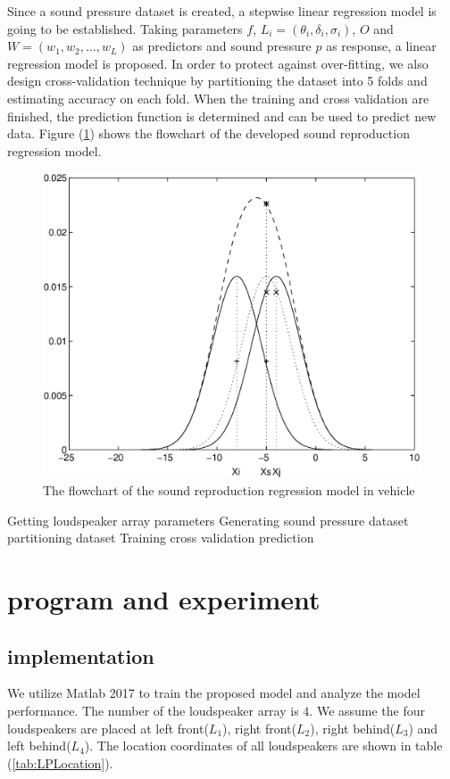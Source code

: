 \documentclass[runningheads,a4paper]{llncs}
\begin{document}
  Since a sound pressure dataset is created, a stepwise linear regression model is going to be established. Taking parameters $f$, $L_i=(\theta_i,\delta_i,\sigma_i)$, $O$ and $ W=(w_1,w_2,\dots,w_L) $ as predictors and sound pressure $p$ as response, a linear regression model is proposed. In order to protect against over-fitting, we also design cross-validation technique by partitioning the dataset into 5 folds and estimating accuracy on each fold. When the training and cross validation are finished, the prediction function is determined and can be used to predict new data. Figure (\ref{fig:ModelFlowchart}) shows the flowchart of the developed sound reproduction regression model.
  \begin{figure}[htb]
    \centering
    \includegraphics[width=11.5cm]{888.eps}
    \caption{The flowchart of the sound reproduction regression model in vehicle}
    \label{fig:ModelFlowchart}
  \end{figure}

Getting loudspeaker array parameters
Generating sound pressure dataset
partitioning dataset
Training
cross validation
prediction

%

\section{program and experiment}\label{sec:experiment}
\subsection{implementation}
We utilize Matlab 2017 to train the proposed model and analyze the model performance. The number of the loudspeaker array is $4$. We assume the four loudspeakers are placed at left front($L_1$), right front($L_2$), right behind($L_3$) and left behind($L_4$). The location coordinates of all loudspeakers are shown in table (\ref{tab:LPLocation}).
\end{document}
